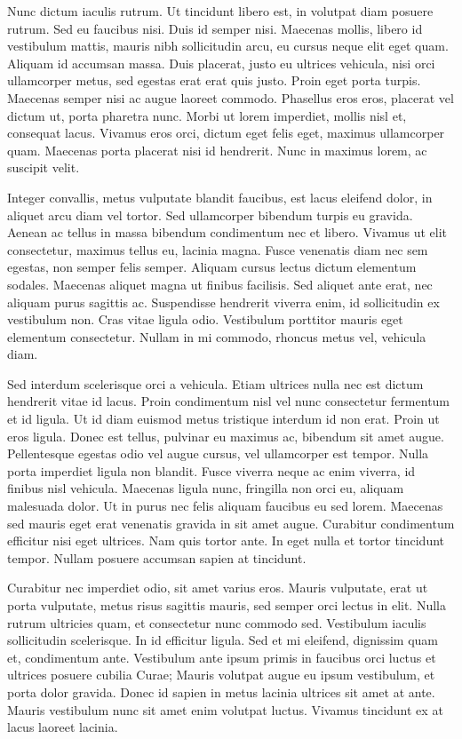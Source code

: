 \begin{btUnit}
Nunc dictum iaculis rutrum. Ut tincidunt libero est, in volutpat diam
posuere rutrum. Sed eu faucibus nisi. Duis id semper nisi. Maecenas
mollis, libero id vestibulum mattis, mauris nibh sollicitudin arcu, eu
cursus neque elit eget quam. Aliquam id accumsan massa. Duis placerat,
justo eu ultrices vehicula, nisi orci ullamcorper metus, sed egestas
erat erat quis justo. Proin eget porta turpis. Maecenas semper nisi ac
augue laoreet commodo. Phasellus eros eros, placerat vel dictum ut,
porta pharetra nunc. Morbi ut lorem imperdiet, mollis nisl et,
consequat lacus. Vivamus eros orci, dictum eget felis eget, maximus
ullamcorper quam. Maecenas porta placerat nisi id hendrerit. Nunc in
maximus lorem, ac suscipit velit.

Integer convallis, metus vulputate blandit faucibus, est lacus
eleifend dolor, in aliquet arcu diam vel tortor. Sed ullamcorper
bibendum turpis eu gravida. Aenean ac tellus in massa bibendum
condimentum nec et libero. Vivamus ut elit consectetur, maximus tellus
eu, lacinia magna. Fusce venenatis diam nec sem egestas, non semper
felis semper. Aliquam cursus lectus dictum elementum sodales. Maecenas
aliquet magna ut finibus facilisis. Sed aliquet ante erat, nec aliquam
purus sagittis ac. Suspendisse hendrerit viverra enim, id sollicitudin
ex vestibulum non. Cras vitae ligula odio. Vestibulum porttitor mauris
eget elementum consectetur. Nullam in mi commodo, rhoncus metus vel,
vehicula diam.

Sed interdum scelerisque orci a vehicula. Etiam ultrices nulla nec est
dictum hendrerit vitae id lacus. Proin condimentum nisl vel nunc
consectetur fermentum et id ligula. Ut id diam euismod metus tristique
interdum id non erat. Proin ut eros ligula. Donec est tellus, pulvinar
eu maximus ac, bibendum sit amet augue. Pellentesque egestas odio vel
augue cursus, vel ullamcorper est tempor. Nulla porta imperdiet ligula
non blandit. Fusce viverra neque ac enim viverra, id finibus nisl
vehicula. Maecenas ligula nunc, fringilla non orci eu, aliquam
malesuada dolor. Ut in purus nec felis aliquam faucibus eu sed lorem.
Maecenas sed mauris eget erat venenatis gravida in sit amet augue.
Curabitur condimentum efficitur nisi eget ultrices. Nam quis tortor
ante. In eget nulla et tortor tincidunt tempor. Nullam posuere
accumsan sapien at tincidunt.

Curabitur nec imperdiet odio, sit amet varius eros. Mauris vulputate,
erat ut porta vulputate, metus risus sagittis mauris, sed semper orci
lectus in elit. Nulla rutrum ultricies quam, et consectetur nunc
commodo sed. Vestibulum iaculis sollicitudin scelerisque. In id
efficitur ligula. Sed et mi eleifend, dignissim quam et, condimentum
ante. Vestibulum ante ipsum primis in faucibus orci luctus et ultrices
posuere cubilia Curae; Mauris volutpat augue eu ipsum vestibulum, et
porta dolor gravida. Donec id sapien in metus lacinia ultrices sit
amet at ante. Mauris vestibulum nunc sit amet enim volutpat luctus.
Vivamus tincidunt ex at lacus laoreet lacinia.


\end{btUnit}
